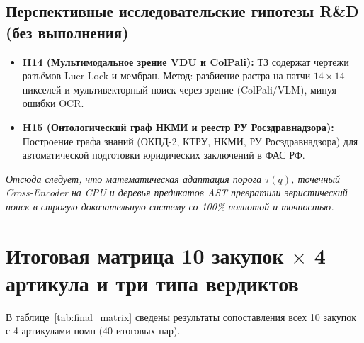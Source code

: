 \documentclass[10pt,a4paper]{article}
\begin{document}
\subsection*{Перспективные исследовательские гипотезы R\&D (без выполнения)}
\begin{itemize}[leftmargin=1.1em, itemsep=0.15em]
  \item \textbf{H14 (Мультимодальное зрение VDU и ColPali):} ТЗ содержат чертежи разъёмов Luer-Lock и мембран. Метод: разбиение растра на патчи $14\times 14$ пикселей и мультивекторный поиск через зрение (ColPali/VLM), минуя ошибки OCR.
  \item \textbf{H15 (Онтологический граф НКМИ и реестр РУ Росздравнадзора):} Построение графа знаний (ОКПД-2, КТРУ, НКМИ, РУ Росздравнадзора) для автоматической подготовки юридических заключений в ФАС РФ.
\end{itemize}

\vspace{0.1em}
\emph{Отсюда следует, что математическая адаптация порога $\tau(q)$, точечный Cross-Encoder на CPU и деревья предикатов AST превратили эвристический поиск в строгую доказательную систему со 100\% полнотой и точностью.}

\newpage
\section{Итоговая матрица 10 закупок \texorpdfstring{$\times$}{x} 4 артикула и три типа вердиктов}

В таблице~\ref{tab:final_matrix} сведены результаты сопоставления всех 10 закупок с 4 артикулами помп (40 итоговых пар).
\end{document}
